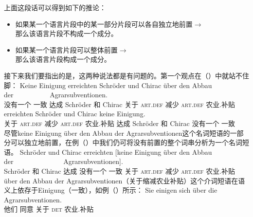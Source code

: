 \noindent
上面这段话可以得到如下的推论：
\begin{itemize}
\item 如果某一个语言片段中的某一部分片段可以各自独立地前置$\to$\\
	那么该语言片段不构成一个成分。
\item 如果某一个语言片段可以整体前置$\to$\\
	那么该语言片段构成一个成分。
\end{itemize}
接下来我们要指出的是，这两种说法都是有问题的。第一个观点在（）中就站不住脚：
\eal
\ex
\gll Keine Einigung erreichten Schröder und Chirac über den          Abbau der~~~~~~~~~~          Agrarsubventionen.\footnotemark\\
     没有一个    一致      达成        Schröder 和  Chirac 关于  \textsc{art}.\textsc{def} 减少  \textsc{art}.\textsc{def} 农业.补贴\\
\ex 
{}     erreichten Schröder und Chirac keine Einigung.\\
     \spacebr{}关于 \textsc{art}.\textsc{def} 减少 \textsc{art}.\textsc{def} 农业.补贴 达成 Schröder 和 Chirac 没有一个 一致\\
\zl
尽管keine Einigung über den Abbau der Agrarsubventionen这个名词短语的一部分可以独立地前置，在例（）中我们仍可将没有前置的整个词串分析为一个名词短语。
\ea
\gll Schröder und Chirac erreichten [keine Einigung über den Abbau der~~~~~~~~~~~~~~ Agrarsubventionen].\\
     Schröder 和 Chirac 达成 \spacebr{}没有一个 一致 关于 \textsc{art}.\textsc{def} 减少 \textsc{art}.\textsc{def} 农业.补贴\\
\z
über den Abbau der Agrarsubventionen（关于缩减农业补贴）这个介词短语在语义上依存于Einigung（一致），如例（）所示：
\ea
\gll Sie einigen sich über die Agrarsubventionen.\\
     他们 同意  关于 \textsc{det} 农业.补贴\\
\z

